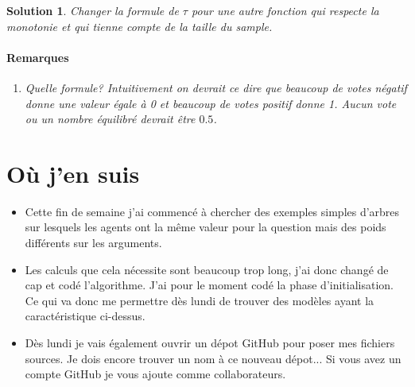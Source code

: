 \documentclass[12pt]{article}
\theoremstyle{defi}
\theoremstyle{not}
\theoremstyle{prob}
\newtheorem{solution}{Solution}
\begin{document}
  \begin{solution}
    Changer la formule de $\tau$ pour une autre fonction qui respecte la monotonie et qui tienne compte de la taille du sample.

    \paragraph{Remarques}
      \begin{enumerate}
        \item Quelle formule? Intuitivement on devrait ce dire que beaucoup de votes négatif donne une valeur égale à 0 et beaucoup de votes positif donne 1. Aucun vote ou un nombre équilibré devrait être $0.5$.
      \end{enumerate}
  \end{solution}
\color{black}
\section{Où j'en suis}
\begin{itemize}
  \item Cette fin de semaine j'ai commencé à chercher des exemples simples d'arbres sur lesquels les agents ont la même valeur pour la question mais des poids différents sur les arguments.

  \item Les calculs que cela nécessite sont beaucoup trop long, j'ai donc changé de cap et codé l'algorithme. J'ai pour le moment codé la phase d'initialisation. Ce qui va donc me permettre dès lundi de trouver des modèles ayant la caractéristique ci-dessus.

  \item Dès lundi je vais également ouvrir un dépot GitHub pour poser mes fichiers sources. Je dois encore trouver un nom à ce nouveau dépot... Si vous avez un compte GitHub je vous ajoute comme collaborateurs.
\end{itemize}
\end{document}
